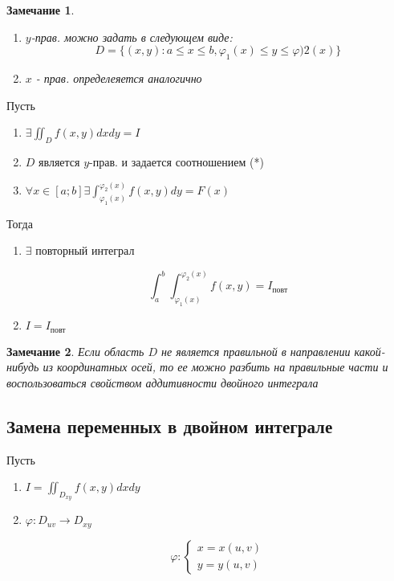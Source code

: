 \documentclass[a4paper, 14pt]{report}
\newtheorem{note}{Замечание}[section]
\begin{document}
\begin{note}
    \begin{enumerate}
        \item $y$-прав. можно задать в следующем виде:
        $$
            D = \{ (x,y) : a \le x \le b, \varphi_1(x) \le y \le \varphi)2(x) \}
        $$

    \item $x$ - прав. определеяется аналогично
    \end{enumerate}
\end{note}

\begin{theorem}
    Пусть 

    \begin{enumerate}
        \item $\exists \iint_D f(x,y) dxdy = I$
        \item $D$ является $y$-прав. и задается соотношением (*)
        \item $\forall x \in [a;b] \exists \int_{\varphi_1(x)}^{\varphi_2(x)} f(x,y) dy = F(x)$
    \end{enumerate}

    Тогда 

    \begin{enumerate}
        \item $\exists$ повторный интеграл

            $$
            \int^b_a \int_{\varphi_1(x)}^{\varphi_2(x)} f(x,y) = I_\text{повт}
            $$

        \item $I = I_\text{повт}$
    \end{enumerate}
\end{theorem}

\begin{note}
    Если область $D$ не является правильной в направлении какой-нибудь из координатных осей, то ее можно разбить на правильные части и воспользоваться свойством аддитивности двойного интеграла
\end{note}

\subsection{Замена переменных в двойном интеграле}

Пусть 

\begin{enumerate}
    \item $I = \iint _{D_{xy}} f(x,y) dxdy$
    \item $\varphi : D_{uv} \to D_{xy}$

        $$
        \varphi : \begin{cases}
            x = x(u,v) \\
            y = y(u,v)
        \end{cases}
        $$
\end{enumerate}
\end{document}
